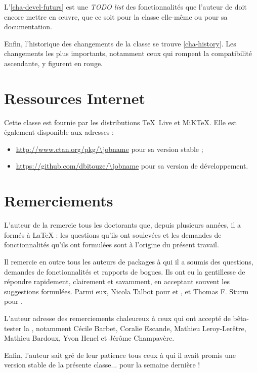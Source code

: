 L'\vref{cha-devel-futurs} est une \emph{TODO list} des fonctionnalités que
l'auteur de \yat{} doit encore mettre en œuvre, que ce soit pour la classe
elle-même ou pour sa documentation.

Enfin, l'historique des changements de la classe se trouve \vref{cha-history}.
Les changements les plus importants, notamment ceux qui rompent la compatibilité
ascendante, y figurent en rouge.

\section{Ressources Internet}
\label{sec-ressources-internet}

Cette classe est fournie par les distributions \TeX~Live et MiK\TeX{}. Elle est
également disponible aux adresses :
\begin{itemize}
\item \url{http://www.ctan.org/pkg/\jobname}
  pour sa version stable ;
\item \url{https://github.com/dbitouze/\jobname} pour sa version de
  développement.
\end{itemize}

\section{Remerciements}
\label{sec-remerciements}

L'auteur de la \yatcl{} remercie tous les doctorants que, depuis plusieurs
années, il a formés à \LaTeX{} : les questions qu'ils ont soulevées et les
demandes de fonctionnalités qu'ils ont formulées sont à l'origine du présent
travail.

Il remercie en outre tous les auteurs de packages à qui il a soumis  des questions, demandes de fonctionnalités et rapports
de bogues. Ils ont eu la gentillesse de répondre rapidement, clairement et
savamment, en acceptant souvent les suggestions formulées. Parmi eux, Nicola
Talbot pour  et , et Thomas F. Sturm
pour .

L'auteur adresse des remerciements chaleureux à ceux qui ont accepté de
bêta-tester la \yatcl{}, notamment Cécile Barbet, Coralie Escande, Mathieu
Leroy-Lerêtre, Mathieu Bardoux, Yvon Henel et Jérôme Champavère.

Enfin, l'auteur sait gré de leur patience tous ceux à qui il avait promis une
version stable de la présente classe... pour la semaine dernière !

%
\iffalse
\fi
